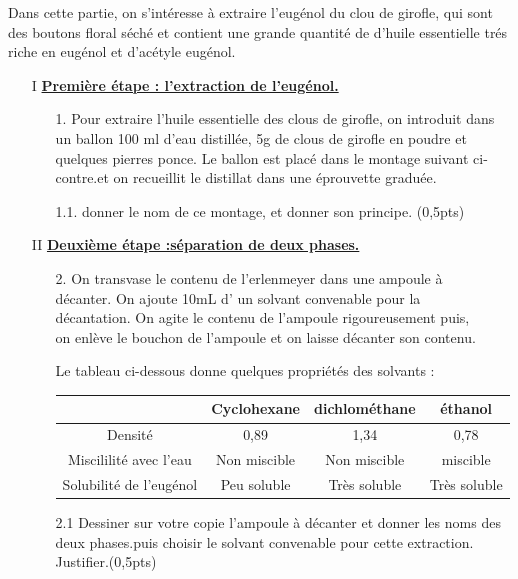 \documentclass[12pt]{article}
\begin{document}
Dans cette partie, on s’intéresse à extraire l’eugénol du clou de
girofle, qui sont des boutons floral séché et contient une grande quantité de d’huile
essentielle trés riche en eugénol et d’acétyle eugénol.
\begin{enumerate}
	\item[I] \underline{\textbf{Première étape : l’extraction de l’eugénol.}}
		\begin{enumerate}
			\item[1.] Pour extraire l’huile essentielle des clous de girofle, on
introduit dans un ballon 100 ml d’eau distillée, 5g de clous de
girofle en poudre et quelques pierres ponce. Le ballon est placé dans
le montage suivant ci-contre.et on recueillit le distillat dans une
éprouvette graduée.
	\item[1.1.] donner le nom de ce montage, et donner son principe. \dotfill(0,5pts)

		\end{enumerate}
	\item[II] \underline{\textbf{Deuxième étape :séparation de deux phases. }}
		\begin{enumerate}
			\item [2.]On transvase le contenu de l’erlenmeyer dans une ampoule à \\décanter. On ajoute 10mL d’ un solvant
convenable pour la \\décantation. On agite le contenu de l’ampoule rigoureusement puis,\\ on enlève le bouchon
de l’ampoule et on laisse décanter son contenu.

Le tableau ci-dessous donne quelques propriétés des solvants :
\begin{center}
\begin{tabular}{ | c | c | c | c | }
	\hline
							& Cyclohexane & dichlométhane &éthanol  \\\hline 
	Densité				    & 0,89        & 1,34          & 0,78\\\hline  
	Miscililité avec l’eau  & Non miscible& Non miscible  & miscible\\\hline  
	Solubilité de l’eugénol & Peu soluble & Très soluble & Très soluble\\\hline  
\end{tabular}
\end{center}

\item[2.1]Dessiner sur votre copie l’ampoule à décanter et donner les noms des deux phases.puis choisir le solvant convenable pour cette extraction. Justifier.\dotfill(0,5pts)


\end{enumerate}
\end{enumerate}
\end{document}
